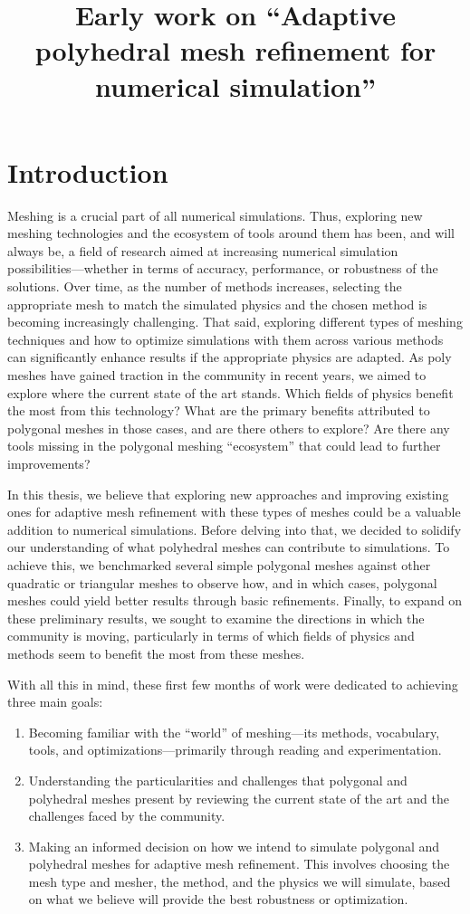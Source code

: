 \documentclass{article}
\title{Early work on ``Adaptive polyhedral mesh refinement for numerical simulation''}
\author{\studentName}
\begin{document}
\maketitle

\section{Introduction}
Meshing is a crucial part of all numerical simulations. Thus, exploring new meshing technologies and the ecosystem of tools around them has been, and will always be, a field of research aimed at increasing numerical simulation possibilities—whether in terms of accuracy, performance, or robustness of the solutions. Over time, as the number of methods increases, selecting the appropriate mesh to match the simulated physics and the chosen method is becoming increasingly challenging. That said, exploring different types of meshing techniques and how to optimize simulations with them across various methods can significantly enhance results if the appropriate physics are adapted. As poly meshes have gained traction in the community in recent years, we aimed to explore where the current state of the art stands. Which fields of physics benefit the most from this technology? What are the primary benefits attributed to polygonal meshes in those cases, and are there others to explore? Are there any tools missing in the polygonal meshing ``ecosystem'' that could lead to further improvements?

In this thesis, we believe that exploring new approaches and improving existing ones for adaptive mesh refinement with these types of meshes could be a valuable addition to numerical simulations. Before delving into that, we decided to solidify our understanding of what polyhedral meshes can contribute to simulations. To achieve this, we benchmarked several simple polygonal meshes against other quadratic or triangular meshes to observe how, and in which cases, polygonal meshes could yield better results through basic refinements. Finally, to expand on these preliminary results, we sought to examine the directions in which the community is moving, particularly in terms of which fields of physics and methods seem to benefit the most from these meshes.

With all this in mind, these first few months of work were dedicated to achieving three main goals:
\begin{enumerate}
\item Becoming familiar with the ``world'' of meshing—its methods, vocabulary, tools, and optimizations—primarily through reading and experimentation.
\item Understanding the particularities and challenges that polygonal and polyhedral meshes present by reviewing the current state of the art and the challenges faced by the community.
\item Making an informed decision on how we intend to simulate polygonal and polyhedral meshes for adaptive mesh refinement. This involves choosing the mesh type and mesher, the method, and the physics we will simulate, based on what we believe will provide the best robustness or optimization.
\end{enumerate}
\end{document}
